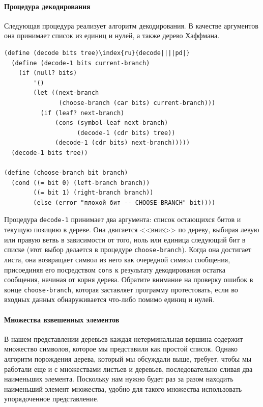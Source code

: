 \paragraph{Процедура декодирования}


Следующая процедура реализует алгоритм декодирования.  В
качестве аргументов она принимает список из единиц и нулей, а также
дерево Хаффмана.

\begin{Verbatim}[fontsize=\small]
(define (decode bits tree)\index{ru}{decode||||pd|}
  (define (decode-1 bits current-branch)
    (if (null? bits)
        '()
        (let ((next-branch
               (choose-branch (car bits) current-branch)))
          (if (leaf? next-branch)
              (cons (symbol-leaf next-branch)
                    (decode-1 (cdr bits) tree))
              (decode-1 (cdr bits) next-branch)))))
  (decode-1 bits tree))

(define (choose-branch bit branch)
  (cond ((= bit 0) (left-branch branch))
        ((= bit 1) (right-branch branch))
        (else (error "плохой бит -- CHOOSE-BRANCH" bit))))
\end{Verbatim}
Процедура {\tt decode-1} принимает два аргумента: список
остающихся битов и текущую позицию в дереве.  Она двигается <<вниз>>
по дереву, выбирая левую или правую ветвь в зависимости от того, ноль
или единица следующий бит в списке (этот выбор делается в процедуре
{\tt choose-branch}).  Когда она достигает листа, она
возвращает символ из него как очередной символ сообщения, присоединяя
его посредством {\tt cons} к результату декодирования остатка
сообщения, начиная от корня дерева.  Обратите внимание на проверку ошибок в
конце {\tt choose-branch}, которая заставляет программу 
протестовать, если во входных данных обнаруживается что-либо помимо единиц 
и нулей.

\paragraph{Множества взвешенных элементов}


В нашем представлении деревьев каждая нетерминальная
вершина содержит множество символов, которое мы представили как
простой список. Однако алгоритм порождения дерева, который мы
обсуждали выше, требует, чтобы мы работали еще и с множествами листьев 
и деревьев, последовательно сливая два наименьших элемента.  Поскольку 
нам нужно будет раз за разом находить наименьший элемент множества,
удобно для такого множества использовать упорядоченное
представление.

